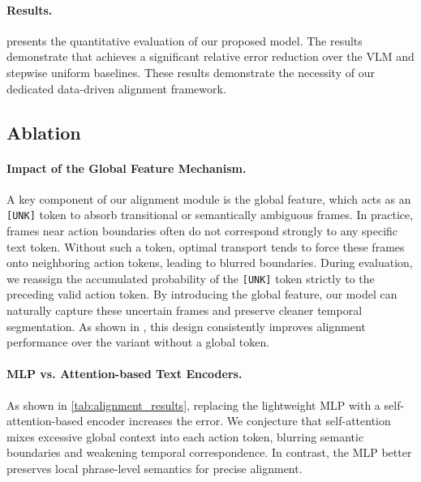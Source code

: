 

\paragraph{Results.}  presents the quantitative evaluation of our proposed model. The results demonstrate that \ours achieves a significant relative error reduction over the VLM and stepwise uniform baselines. These results demonstrate the necessity of our dedicated data-driven alignment framework.

\subsection{Ablation} 
\paragraph{Impact of the Global Feature Mechanism.} 
A key component of our alignment module is the global feature, which acts as an \texttt{[UNK]} token to absorb transitional or semantically ambiguous frames. In practice, frames near action boundaries often do not correspond strongly to any specific text token. Without such a token, optimal transport tends to force these frames onto neighboring action tokens, leading to blurred boundaries. During evaluation, we reassign the accumulated probability of the \texttt{[UNK]} token strictly to the preceding valid action token. By introducing the global feature, our model can naturally capture these uncertain frames and preserve cleaner temporal segmentation. As shown in , this design consistently improves alignment performance over the variant without a global token.

\paragraph{MLP vs. Attention-based Text Encoders.}
As shown in \cref{tab:alignment_results}, replacing the lightweight MLP with a self-attention-based encoder increases the error. We conjecture that self-attention mixes excessive global context into each action token, blurring semantic boundaries and weakening temporal correspondence. In contrast, the MLP better preserves local phrase-level semantics for precise alignment.

